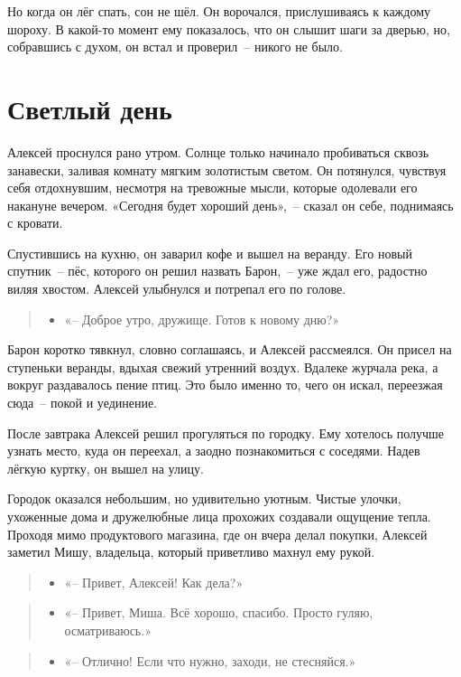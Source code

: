 \documentclass[12pt,a4paper]{book}
\newenvironment{dialogue}{\begin{quote}\itshape\begin{itemize}\item[]}{\end{itemize}\end{quote}}
\begin{document}
Но когда он лёг спать, сон не шёл. Он ворочался, прислушиваясь к каждому шороху. В какой-то момент ему показалось, что он слышит шаги за дверью, но, собравшись с духом, он встал и проверил~-- никого не было.

\chapter{Светлый день}

Алексей проснулся рано утром. Солнце только начинало пробиваться сквозь занавески, заливая комнату мягким золотистым светом. Он потянулся, чувствуя себя отдохнувшим, несмотря на тревожные мысли, которые одолевали его накануне вечером. «Сегодня будет хороший день»,~-- сказал он себе, поднимаясь с кровати.

Спустившись на кухню, он заварил кофе и вышел на веранду. Его новый спутник~-- пёс, которого он решил назвать Барон,~-- уже ждал его, радостно виляя хвостом. Алексей улыбнулся и потрепал его по голове.

\begin{dialogue}
«-- Доброе утро, дружище. Готов к новому дню?»
\end{dialogue}

Барон коротко тявкнул, словно соглашаясь, и Алексей рассмеялся. Он присел на ступеньки веранды, вдыхая свежий утренний воздух. Вдалеке журчала река, а вокруг раздавалось пение птиц. Это было именно то, чего он искал, переезжая сюда~-- покой и уединение.

После завтрака Алексей решил прогуляться по городку. Ему хотелось получше узнать место, куда он переехал, а заодно познакомиться с соседями. Надев лёгкую куртку, он вышел на улицу.

Городок оказался небольшим, но удивительно уютным. Чистые улочки, ухоженные дома и дружелюбные лица прохожих создавали ощущение тепла. Проходя мимо продуктового магазина, где он вчера делал покупки, Алексей заметил Мишу, владельца, который приветливо махнул ему рукой.

\begin{dialogue}
«-- Привет, Алексей! Как дела?»
\end{dialogue}

\begin{dialogue}
«-- Привет, Миша. Всё хорошо, спасибо. Просто гуляю, осматриваюсь.»
\end{dialogue}

\begin{dialogue}
«-- Отлично! Если что нужно, заходи, не стесняйся.»
\end{dialogue}
\end{document}
